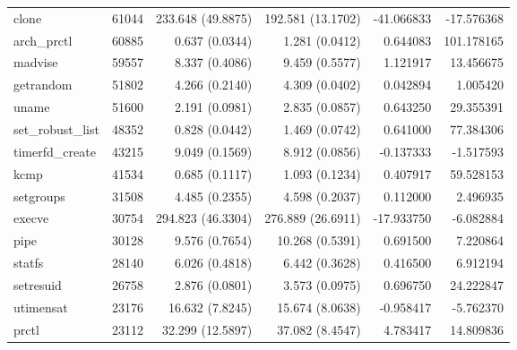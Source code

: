 \begin{longtable}{>{\ttfamily}lrrrrr}
                          clone &      61044 &        233.648 (49.8875) &        192.581 (13.1702) &      -41.066833 &   -17.576368 \\
                    arch\_prctl &      60885 &           0.637 (0.0344) &           1.281 (0.0412) &        0.644083 &   101.178165 \\
                        madvise &      59557 &           8.337 (0.4086) &           9.459 (0.5577) &        1.121917 &    13.456675 \\
                      getrandom &      51802 &           4.266 (0.2140) &           4.309 (0.0402) &        0.042894 &     1.005420 \\
                          uname &      51600 &           2.191 (0.0981) &           2.835 (0.0857) &        0.643250 &    29.355391 \\
              set\_robust\_list &      48352 &           0.828 (0.0442) &           1.469 (0.0742) &        0.641000 &    77.384306 \\
                timerfd\_create &      43215 &           9.049 (0.1569) &           8.912 (0.0856) &       -0.137333 &    -1.517593 \\
                           kcmp &      41534 &           0.685 (0.1117) &           1.093 (0.1234) &        0.407917 &    59.528153 \\
                      setgroups &      31508 &           4.485 (0.2355) &           4.598 (0.2037) &        0.112000 &     2.496935 \\
                         execve &      30754 &        294.823 (46.3304) &        276.889 (26.6911) &      -17.933750 &    -6.082884 \\
                           pipe &      30128 &           9.576 (0.7654) &          10.268 (0.5391) &        0.691500 &     7.220864 \\
                         statfs &      28140 &           6.026 (0.4818) &           6.442 (0.3628) &        0.416500 &     6.912194 \\
                      setresuid &      26758 &           2.876 (0.0801) &           3.573 (0.0975) &        0.696750 &    24.222847 \\
                      utimensat &      23176 &          16.632 (7.8245) &          15.674 (8.0638) &       -0.958417 &    -5.762370 \\
                          prctl &      23112 &         32.299 (12.5897) &          37.082 (8.4547) &        4.783417 &    14.809836 \\

\end{longtable}

